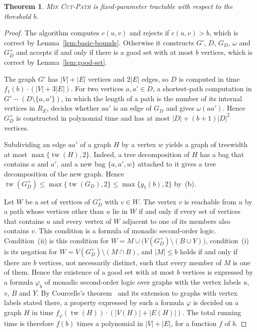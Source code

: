 \documentclass[a4paper,fleqn]{cas-sc}
\numberwithin{equation}{section}
\theoremstyle{definition}
\theoremstyle{plain}
\newtheorem{theorem}[definition]{Theorem}
\theoremstyle{remark}
\newcommand{\tw}{\operatorname{tw}}
\newcommand{\MinCutPath}{\textsc{Min Cut-Path}}
\begin{document}
\begin{theorem}
\label{thm:fpt}
\MinCutPath{} is fixed-parameter tractable with respect to the threshold $b$.
\end{theorem}

\begin{proof}
The algorithm computes $c(u,v)$ and rejects if $c(u,v) > b$, which is correct by Lemma~\ref{lem:basic-bounds}.
Otherwise it constructs $G'$, $D$, $G_D$, $\omega$ and $G_D^+$ and accepts if and only if there is a good set with at most $b$ vertices, which is correct by Lemma~\ref{lem:good-set}.

The graph $G'$ has $|V| + |E|$ vertices and $2|E|$ edges, so $D$ is computed in time $f_1(b) \cdot (|V| + 3|E|)$.
For two vertices $a, a' \in D$, a shortest-path computation in $G' - (D \setminus \{a, a'\})$, in which the length of a path is the number of its internal vertices in $R_E$, decides whether $aa'$ is an edge of $G_D$ and gives $\omega(aa')$.
Hence $G_D^+$ is constructed in polynomial time and has at most $|D| + (b+1)|D|^2$ vertices.

Subdividing an edge $aa'$ of a graph $H$ by a vertex $w$ yields a graph of treewidth at most $\max\{\tw(H), 2\}$.
Indeed, a tree decomposition of $H$ has a bag that contains $a$ and $a'$, and a new bag $\{a, a', w\}$ attached to it gives a tree decomposition of the new graph.
Hence $\tw(G_D^+) \leq \max\{\tw(G_D), 2\} \leq \max\{g_1(b), 2\}$ by~(b).

Let $W$ be a set of vertices of $G_D^+$ with $v \in W$.
The vertex $v$ is reachable from $u$ by a path whose vertices other than $u$ lie in $W$ if and only if every set of vertices that contains $u$ and every vertex of $W$ adjacent to one of its members also contains $v$.
This condition is a formula of monadic second-order logic.
Condition~(ii) is this condition for $W = M \cup \bigl(V(G_D^+) \setminus (B \cup Y)\bigr)$, condition~(i) is its negation for $W = V(G_D^+) \setminus (M \cap B)$, and $|M| \leq b$ holds if and only if there are $b$ vertices, not necessarily distinct, such that every member of $M$ is one of them.
Hence the existence of a good set with at most $b$ vertices is expressed by a formula $\varphi_b$ of monadic second-order logic over graphs with the vertex labels $u$, $v$, $B$ and $Y$.
By Courcelle's theorem~\cite[Theorem~2.2]{Marx2013Separators} and its extension to graphs with vertex labels stated there, a property expressed by such a formula $\varphi$ is decided on a graph $H$ in time $f_\varphi(\tw(H)) \cdot (|V(H)| + |E(H)|)$.
The total running time is therefore $f(b)$ times a polynomial in $|V| + |E|$, for a function $f$ of $b$.
\end{proof}
\end{document}
